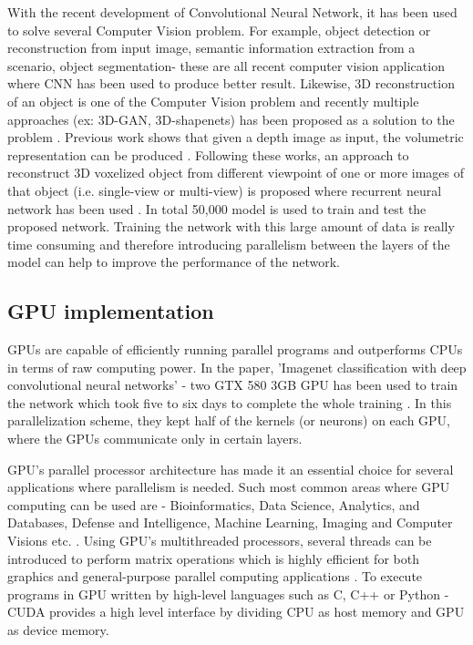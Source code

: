 \documentclass[11pt]{article}       %
\begin{document}
With the recent development of Convolutional Neural Network, it has been used to solve several Computer Vision problem. For example, object detection or reconstruction from input image, semantic information extraction from a scenario, object segmentation- these are all recent computer vision application where CNN has been used to produce better result. Likewise, 3D reconstruction of an object is one of the Computer Vision problem and recently multiple approaches (ex: 3D-GAN, 3D-shapenets) has been proposed as a solution to the problem \cite{dr1}. Previous work shows that given a depth image as input, the volumetric representation can be produced \cite{dr2}. Following these works, an approach to reconstruct 3D voxelized object from different viewpoint of one or more images of that object (i.e. single-view or multi-view) is proposed where recurrent neural network has been used \cite{dr7}. In total 50,000 model is used to train and test the proposed network. Training the network with this large amount of data is really time consuming and therefore introducing parallelism between the layers of the model can help to improve the performance of the network.

\subsection{GPU implementation} \label{GPUimpl}
GPUs are capable of efficiently running parallel programs and outperforms CPUs in terms of raw computing power. In the paper, 'Imagenet classification with deep convolutional neural networks' - two GTX 580 3GB GPU has been used to train the network which took five to six days to complete the whole training \cite{dr5}. In this parallelization scheme, they kept half of the kernels (or neurons) on each GPU, where the GPUs communicate only in certain layers.

GPU's parallel processor architecture has made it an essential choice for several applications where parallelism is needed. Such most common areas where GPU computing can be used are - Bioinformatics, Data Science, Analytics, and Databases, Defense and Intelligence, Machine Learning, Imaging and Computer Visions etc. \cite{samel2016gpu}. Using GPU's multithreaded processors, several threads can be introduced to perform matrix operations which is highly efficient for both graphics and general-purpose parallel computing applications \cite{nickolls2008scalable}. To execute programs in GPU written by high-level languages such as C, C++ or Python - CUDA provides a high level interface by dividing CPU as host memory and GPU as device memory.




\end{document}
